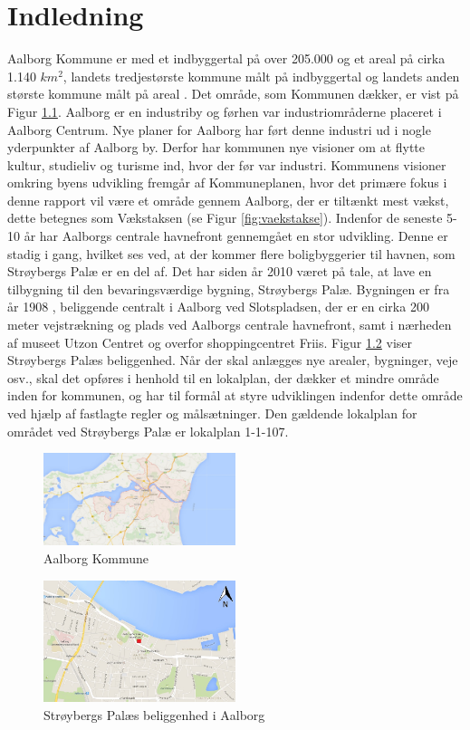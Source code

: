 \chapter{Indledning}
Aalborg Kommune er med et indbyggertal på over 205.000 og et areal på cirka  1.140 $km^2$, landets tredjestørste kommune målt på indbyggertal og landets anden største kommune målt på areal \citep{indbyggertal}. Det område, som Kommunen dækker, er vist på Figur \ref{fig:aalborgkommune}. 
\newline \indent{     }  Aalborg er en industriby og førhen var industriområderne placeret i Aalborg Centrum. Nye planer for Aalborg har ført denne industri ud i nogle yderpunkter af Aalborg by. Derfor har kommunen nye visioner om at flytte kultur, studieliv og turisme ind, hvor der før var industri. Kommunens visioner omkring byens udvikling fremgår af Kommuneplanen, hvor det primære fokus i denne rapport vil være et område gennem Aalborg, der er tiltænkt mest vækst, dette betegnes som Vækstaksen (se Figur \ref{fig:vaekstakse}).
\newline \indent{     }  Indenfor de seneste 5-10 år har Aalborgs centrale havnefront gennemgået en stor udvikling. Denne er stadig i gang, hvilket ses ved, at der kommer flere boligbyggerier til havnen, som Strøybergs Palæ er en del af. 
\newline \indent{     }  Det har siden år 2010 været på tale, at lave en tilbygning til den bevaringsværdige bygning, Strøybergs Palæ. Bygningen er fra år 1908 \citep{citep}, beliggende centralt i Aalborg ved Slotspladsen, der er en cirka 200 meter vejstrækning og plads ved Aalborgs centrale havnefront, samt i nærheden af museet Utzon Centret og overfor shoppingcentret Friis. Figur \ref{fig:aalborg} viser Strøybergs Palæs beliggenhed. 
\newline \indent{     }  Når der skal anlægges nye arealer, bygninger, veje osv., skal det opføres i henhold til en lokalplan, der dækker et mindre område inden for kommunen, og har til formål at styre udviklingen indenfor dette område ved hjælp af fastlagte regler og målsætninger. Den gældende lokalplan for området ved Strøybergs Palæ er lokalplan 1-1-107. 
\begin{figure}[htbp]
	\centering
	\includegraphics[width=0.5\textwidth]{billeder/aalborgkommune.png}
	\caption{Aalborg Kommune}
	\label{fig:aalborgkommune}
\end{figure}
\begin{figure}[htbp]
	\centering
	\includegraphics[width=0.5\textwidth]{billeder/aalborg.png}
	\caption{Strøybergs Palæs beliggenhed i Aalborg}
	\label{fig:aalborg}
\end{figure}